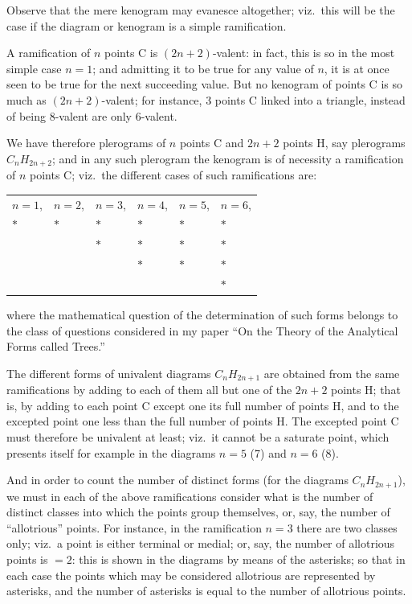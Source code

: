 \documentclass[11pt,a4paper]{article}
\theoremstyle{plain}
\theoremstyle{definition}
\theoremstyle{remark}
\begin{document}
Observe that the mere kenogram may evanesce altogether; viz.\ this will be the case if the diagram or kenogram is a simple ramification.

A ramification of $n$ points C is $(2n + 2)$-valent: in fact, this is so in the most simple case $n = 1$; and admitting it to be true for any value of $n$, it is at once seen to be true for the next succeeding value. But no kenogram of points C is so much as $(2n + 2)$-valent; for instance, 3 points C linked into a triangle, instead of being 8-valent are only 6-valent.

We have therefore plerograms of $n$ points C and $2n + 2$ points H, say plerograms $C_n H_{2n+2}$; and in any such plerogram the kenogram is of necessity a ramification of $n$ points C; viz.\ the different cases of such ramifications are:

\begin{center}
\begin{tabular}{llllll}
$n = 1$, & $n = 2$, & $n = 3$, & $n = 4$, & $n = 5$, & $n = 6$, \\
$*$ & $*$ & $*$ & $*$ & $*$ & $*$ \\
& & $*$ & $*$ & $*$ & $*$ \\
& & & $*$ & $*$ & $*$ \\
& & & & & $*$
\end{tabular}
\end{center}

where the mathematical question of the determination of such forms belongs to the class of questions considered in my paper ``On the Theory of the Analytical Forms called Trees.''

The different forms of univalent diagrams $C_n H_{2n+1}$ are obtained from the same ramifications by adding to each of them all but one of the $2n + 2$ points H; that is, by adding to each point C except one its full number of points H, and to the excepted point one less than the full number of points H. The excepted point C must therefore be univalent at least; viz.\ it cannot be a saturate point, which presents itself for example in the diagrams $n = 5$ (7) and $n = 6$ (8).

And in order to count the number of distinct forms (for the diagrams $C_n H_{2n+1}$), we must in each of the above ramifications consider what is the number of distinct classes into which the points group themselves, or, say, the number of ``allotrious'' points. For instance, in the ramification $n = 3$ there are two classes only; viz.\ a point is either terminal or medial; or, say, the number of allotrious points is $= 2$: this is shown in the diagrams by means of the asterisks; so that in each case the points which may be considered allotrious are represented by asterisks, and the number of asterisks is equal to the number of allotrious points.
\end{document}
